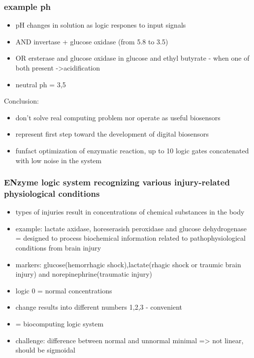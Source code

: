 \documentclass[runningheads]{llncs}
\begin{document}
\subsubsection{example ph}
	\begin{itemize}
		\item pH changes in solution as logic respones to input signals
		\item AND invertase + glucose oxidase (from 5.8 to 3.5)
		\item OR ersterase and glucose oxidase in glucose and ethyl butyrate - when one of both present ->acidification  
		\item neutral ph = 3,5
	\end{itemize}
	Conclusion: 
	\begin{itemize}
		\item don't solve real computing problem  nor operate as useful biosensors 
		\item represent first step toward the development of digital biosensors 
		\item funfact optimization of enzymatic reaction, up to 10 logic gates concatenated with low noise in the system 
	\end{itemize}


\subsubsection{ENzyme logic system recognizing various injury-related physiological conditions}
	\begin{itemize}
		\item types of injuries result in concentrations of chemical substances in the body
		\\	
		\item example: lactate axidase, horeserasish peroxidase and glucose dehydrogenase = designed to process biochemical information related to pathophysiological conditions from brain injury
		\item markers: glucose(hemorrhagic shock),lactate(rhagic shock or traumic brain injury) and norepinephrine(traumatic injury)
		\item logic 0 = normal concentrations
		\item change results into different numbers 1,2,3 - convenient
		\item = biocomputing logic system 
		\item challenge: difference between normal and unnormal minimal => not linear, should be sigmoidal	
	\end{itemize}
\end{document}
